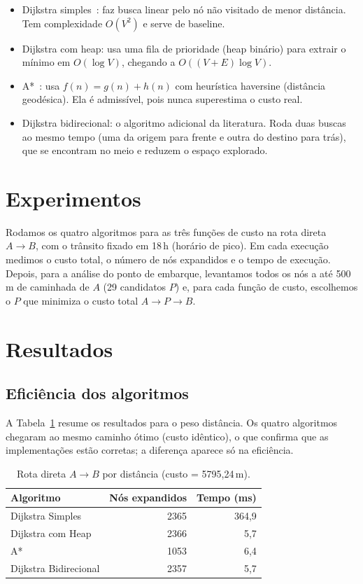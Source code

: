 \documentclass[conference]{IEEEtran}
\begin{document}
\begin{itemize}
 \item Dijkstra simples~\cite{dijkstra1959}: faz busca linear pelo nó não
 visitado de menor distância. Tem complexidade $O(V^2)$ e serve de baseline.
 \item Dijkstra com heap: usa uma fila de prioridade (heap binário) para
 extrair o mínimo em $O(\log V)$, chegando a $O((V+E)\log V)$.
 \item A*~\cite{hart1968}: usa $f(n)=g(n)+h(n)$ com heurística haversine
 (distância geodésica). Ela é admissível, pois nunca superestima o custo real.
 \item Dijkstra bidirecional: o algoritmo adicional da literatura. Roda duas
 buscas ao mesmo tempo (uma da origem para frente e outra do destino para trás), que se
 encontram no meio e reduzem o espaço explorado.
\end{itemize}

\section{Experimentos}
Rodamos os quatro algoritmos para as três funções de custo na rota direta
$A \rightarrow B$, com o trânsito fixado em 18\,h (horário de pico). Em cada execução
medimos o custo total, o número de nós expandidos e o tempo de execução. Depois, para a
análise do ponto de embarque, levantamos todos os nós a até 500\,m de caminhada de $A$
(29 candidatos $P$) e, para cada função de custo, escolhemos o $P$ que minimiza o custo
total $A \rightarrow P \rightarrow B$.

\section{Resultados}

\subsection{Eficiência dos algoritmos}
A Tabela~\ref{tab:algos} resume os resultados para o peso distância. Os quatro
algoritmos chegaram ao mesmo caminho ótimo (custo idêntico), o que confirma que
as implementações estão corretas; a diferença aparece só na eficiência.

\begin{table}[!t]
\caption{Rota direta $A\rightarrow B$ por distância (custo = 5795{,}24\,m).}
\label{tab:algos}
\centering
\begin{tabular}{lrr}
\toprule
Algoritmo & Nós expandidos & Tempo (ms) \\
\midrule
Dijkstra Simples & 2365 & 364{,}9 \\
Dijkstra com Heap & 2366 & 5{,}7 \\
A* & 1053 & 6{,}4 \\
Dijkstra Bidirecional & 2357 & 5{,}7 \\
\bottomrule
\end{tabular}
\end{table}
\end{document}
